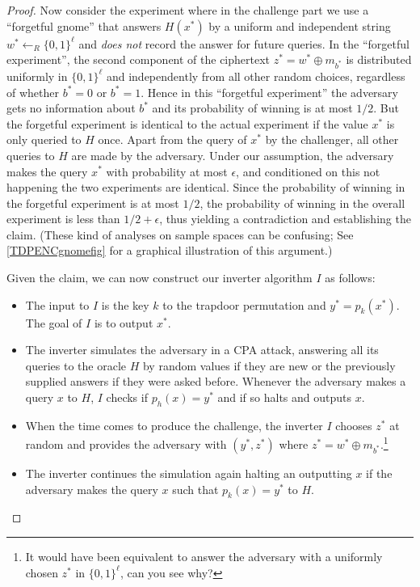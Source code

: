 \begin{proof}
Now consider the experiment where in the challenge part we use a
``forgetful gnome'' that answers \(H(x^*)\) by a uniform and independent
string \(w^* \leftarrow_R \{0,1\}^\ell\) and \emph{does not} record the
answer for future queries. In the ``forgetful experiment'', the second
component of the ciphertext \(z^* = w^* \oplus m_{b^*}\) is distributed
uniformly in \(\{0,1\}^\ell\) and independently from all other random
choices, regardless of whether \(b^*=0\) or \(b^*=1\). Hence in this
``forgetful experiment'' the adversary gets no information about \(b^*\)
and its probability of winning is at most \(1/2\). But the forgetful
experiment is identical to the actual experiment if the value \(x^*\) is
only queried to \(H\) once. Apart from the query of \(x^*\) by the
challenger, all other queries to \(H\) are made by the adversary. Under
our assumption, the adversary makes the query \(x^*\) with probability
at most \(\epsilon\), and conditioned on this not happening the two
experiments are identical. Since the probability of winning in the
forgetful experiment is at most \(1/2\), the probability of winning in
the overall experiment is less than \(1/2+\epsilon\), thus yielding a
contradiction and establishing the claim. (These kind of analyses on
sample spaces can be confusing; See \cref{TDPENCgnomefig} for a
graphical illustration of this argument.)

Given the claim, we can now construct our inverter algorithm \(I\) as
follows:

\begin{itemize}
\item
  The input to \(I\) is the key \(k\) to the trapdoor permutation and
  \(y^* = p_k(x^*)\). The goal of \(I\) is to output \(x^*\).
\item
  The inverter simulates the adversary in a CPA attack, answering all
  its queries to the oracle \(H\) by random values if they are new or
  the previously supplied answers if they were asked before. Whenever
  the adversary makes a query \(x\) to \(H\), \(I\) checks if
  \(p_h(x)=y^*\) and if so halts and outputs \(x\).
\item
  When the time comes to produce the challenge, the inverter \(I\)
  chooses \(z^*\) at random and provides the adversary with
  \((y^*,z^*)\) where \(z^* = w^* \oplus m_{b^*}\).\footnote{It would
    have been equivalent to answer the adversary with a uniformly chosen
    \(z^*\) in \(\{0,1\}^\ell\), can you see why?}
\item
  The inverter continues the simulation again halting an outputting
  \(x\) if the adversary makes the query \(x\) such that \(p_k(x)=y^*\)
  to \(H\).
\end{itemize}


\end{proof}
